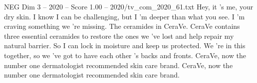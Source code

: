 \begin{textsample}{NEG Dim 3 – 2020 – Score 1.00 – 2020/tv\_com\_2020\_61.txt}  \label{ex:f3_neg_040}
Hey, it 's me, your dry skin.
I know I can be challenging, but I 'm deeper than what you see.
I 'm craving something we 're missing.
The ceramides in CeraVe.
CeraVe contains three essential ceramides to restore the ones we 've lost and help repair my natural barrier.
So I can lock in moisture and keep us protected.
We 're in this together, so we 've got to have each other 's backs and fronts.
CeraVe, now the number one dermatologist recommended skin care brand.
CeraVe, now the number one dermatologist recommended skin care brand.

\end{textsample}
